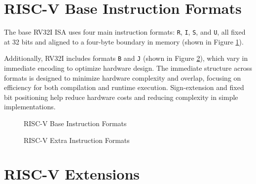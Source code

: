 \section{RISC-V Base Instruction Formats}
\label{sec:riscv_bif}

The base RV32I ISA uses four main instruction formats: \texttt{R}, \texttt{I}, \texttt{S},
and \texttt{U}, all fixed at 32 bits and aligned to a four-byte boundary in memory
(shown in Figure \ref{fig:instrformats}).

Additionally, RV32I includes formats \texttt{B} and \texttt{J} (shown in Figure \ref{fig:extrainstrformats}),
which vary in immediate encoding to optimize hardware design. The immediate
structure across formats is designed to minimize hardware complexity and overlap,
focusing on efficiency for both compilation and runtime execution. Sign-extension
and fixed bit positioning help reduce hardware costs and reducing complexity in
simple implementations.

\begin{figure}[htbp]
  \centering
  \def\stackalignment{r}
  {\scriptsize }
  \caption{RISC-V Base Instruction Formats}
  \label{fig:instrformats}
\end{figure}

\begin{figure}[htbp]
  \centering
  \def\stackalignment{r} %
  {\scriptsize }
  \caption{RISC-V Extra Instruction Formats}
  \label{fig:extrainstrformats}
\end{figure}

\section{RISC-V Extensions}
\label{sec:riscv_extensions}

